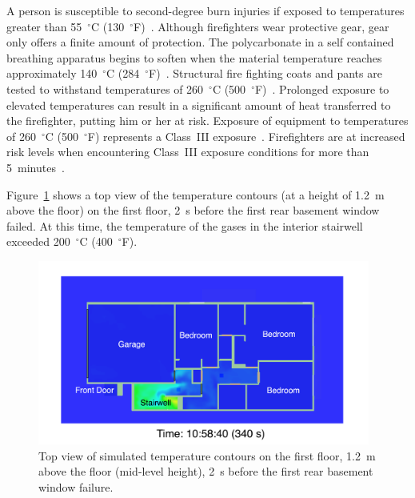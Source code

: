 \documentclass[12pt,oneside]{book}
\begin{document}
A person is susceptible to second-degree burn injuries if exposed to temperatures greater than 55~$^{\circ}$C (130~$^{\circ}$F)~\cite{contactburn}. Although firefighters wear protective gear, gear only offers a finite amount of protection. The polycarbonate in a self contained breathing apparatus begins to soften when the material temperature reaches approximately 140~$^{\circ}$C (284~$^{\circ}$F)~\cite{mensch2011emergency}. Structural fire fighting coats and pants are tested to withstand temperatures of 260~$^{\circ}$C (500~$^{\circ}$F)~\cite{nfpa2013standard}. Prolonged exposure to elevated temperatures can result in a significant amount of heat transferred to the firefighter, putting him or her at risk. Exposure of equipment to temperatures of 260~$^{\circ}$C (500~$^{\circ}$F) represents a Class~III exposure~\cite{Donnelly2006}. Firefighters are at increased risk levels when encountering Class~III exposure conditions for more than 5~minutes~\cite{Donnelly2006}.

Figure~\ref{fig:smv_flow_path_top_1} shows a top view of the temperature contours (at a height of 1.2~m above the floor) on the first floor, 2~s before the first rear basement window failed. At this time, the temperature of the gases in the interior stairwell exceeded 200~$^{\circ}$C (400~$^{\circ}$F).

\begin{figure}[!ht]
\includegraphics[width=4.3in]{../Figures/SMV_Top_Temp_340_s}


\caption[Simulated temperature contours on the first floor before basement window failure.]
{Top view of simulated temperature contours on the first floor, 1.2~m above the floor (mid-level height), 2~s before the first rear basement window failure.}
\label{fig:smv_flow_path_top_1}
\end{figure}
\end{document}

